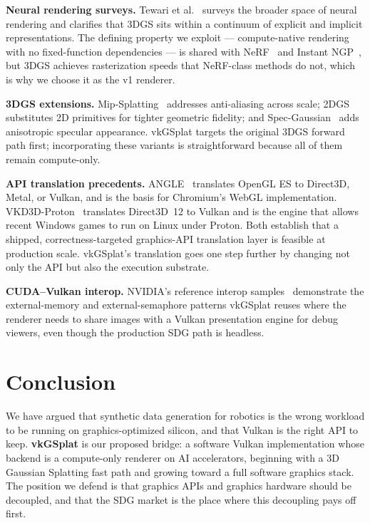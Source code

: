 \documentclass[10pt,journal]{IEEEtran}
\begin{document}
\textbf{Neural rendering surveys.} Tewari et al.~\cite{tewari2022advances}
surveys the broader space of neural rendering and clarifies that
3DGS sits within a continuum of explicit and implicit
representations. The defining property we exploit ---
compute-native rendering with no fixed-function dependencies --- is
shared with NeRF~\cite{mildenhall2020nerf} and Instant
NGP~\cite{mueller2022instant}, but 3DGS achieves rasterization speeds
that NeRF-class methods do not, which is why we choose it as the v1
renderer.

\textbf{3DGS extensions.} Mip-Splatting~\cite{yu2024mip}
addresses anti-aliasing across scale; 2DGS~\cite{huang20242dgs}
substitutes 2D primitives for tighter geometric fidelity; and
Spec-Gaussian~\cite{yang2024specgaussian} adds anisotropic specular
appearance. vkGSplat targets the original 3DGS forward path first;
incorporating these variants is straightforward because all of them
remain compute-only.

\textbf{API translation precedents.} ANGLE~\cite{angle} translates
OpenGL ES to Direct3D, Metal, or Vulkan, and is the basis for
Chromium's WebGL implementation. VKD3D-Proton~\cite{vkd3dproton}
translates Direct3D~12 to Vulkan and is the engine that allows recent
Windows games to run on Linux under Proton. Both establish that a
shipped, correctness-targeted graphics-API translation layer is
feasible at production scale. vkGSplat's translation goes one step
further by changing not only the API but also the execution
substrate.

\textbf{CUDA--Vulkan interop.} NVIDIA's reference interop
samples~\cite{nvidia2020vkcuda} demonstrate the external-memory and
external-semaphore patterns vkGSplat reuses where the renderer needs
to share images with a Vulkan presentation engine for debug viewers,
even though the production SDG path is headless.

\section{Conclusion}

We have argued that synthetic data generation for robotics is the wrong
workload to be running on graphics-optimized silicon, and that Vulkan is
the right API to keep. \textbf{vkGSplat} is our proposed bridge: a
software Vulkan implementation whose backend is a compute-only renderer
on AI accelerators, beginning with a 3D Gaussian Splatting fast path
and growing toward a full software graphics stack. The position we
defend is that graphics APIs and graphics hardware should be decoupled,
and that the SDG market is the place where this decoupling pays off
first.
\end{document}
